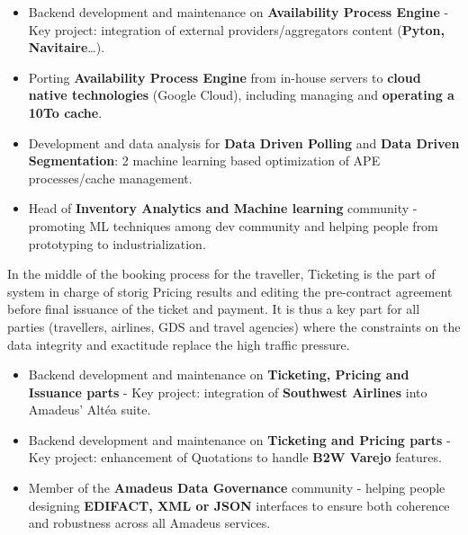 \documentclass[10pt, a4paper, ragged2e]{altacv}
\begin{document}
		\medskip
		\begin{itemize}
			\item Backend development and maintenance on \textbf{Availability Process Engine} - Key project: integration of external providers/aggregators content (\textbf{Pyton, Navitaire}\ldots).
			\item Porting \textbf{Availability Process Engine} from in-house servers to \textbf{cloud native technologies} (Google Cloud), including managing and \textbf{operating a 10To cache}.
			\item Development and data analysis for \textbf{Data Driven Polling} and \textbf{Data Driven Segmentation}: 2 machine learning based optimization of APE processes/cache management.
			\item Head of \textbf{Inventory Analytics and Machine learning} community - promoting ML techniques among dev community and helping people from prototyping to industrialization.
		\end{itemize}
	\divider


		In the middle of the booking process for the traveller, Ticketing is the part of system in charge of storig Pricing results and editing the pre-contract agreement before final issuance of the ticket and payment. It is thus a key part for all parties (travellers, airlines, GDS and travel agencies) where the constraints on the data integrity and exactitude replace the high traffic pressure.

		\medskip
		\begin{itemize}
			\item Backend development and maintenance on \textbf{Ticketing, Pricing and Issuance parts} - Key project: integration of \textbf{Southwest Airlines} into Amadeus' Altéa suite.
			\item Backend development and maintenance on \textbf{Ticketing and Pricing parts} - Key project: enhancement of Quotations to handle \textbf{B2W Varejo} features.
			\item Member of the \textbf{Amadeus Data Governance} community - helping people designing \textbf{EDIFACT, XML or JSON} interfaces to ensure both coherence and robustness across all Amadeus services.
		\end{itemize}
	\divider

		
\end{document}
